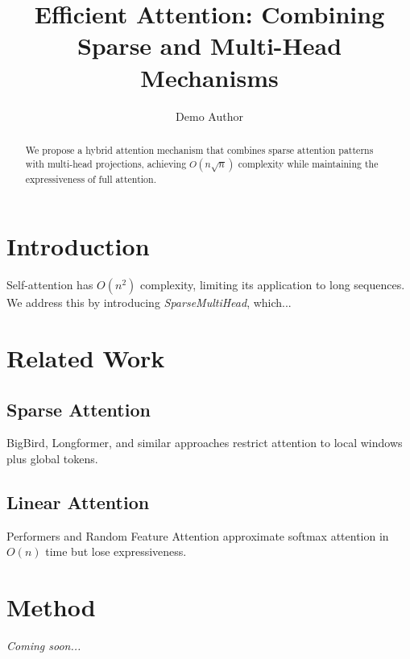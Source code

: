 \documentclass{article}
\title{Efficient Attention: Combining Sparse and Multi-Head Mechanisms}
\author{Demo Author}
\begin{document}
\maketitle
\begin{abstract}
We propose a hybrid attention mechanism that combines sparse attention patterns
with multi-head projections, achieving $O(n \sqrt{n})$ complexity while maintaining
the expressiveness of full attention.
\end{abstract}

\section{Introduction}
Self-attention has $O(n^2)$ complexity, limiting its application to long sequences.
We address this by introducing \textit{SparseMultiHead}, which...

\section{Related Work}
\subsection{Sparse Attention}
BigBird, Longformer, and similar approaches restrict attention to local windows
plus global tokens.

\subsection{Linear Attention}
Performers and Random Feature Attention approximate softmax attention in $O(n)$ time
but lose expressiveness.

\section{Method}
\textit{Coming soon...}



\end{document}

